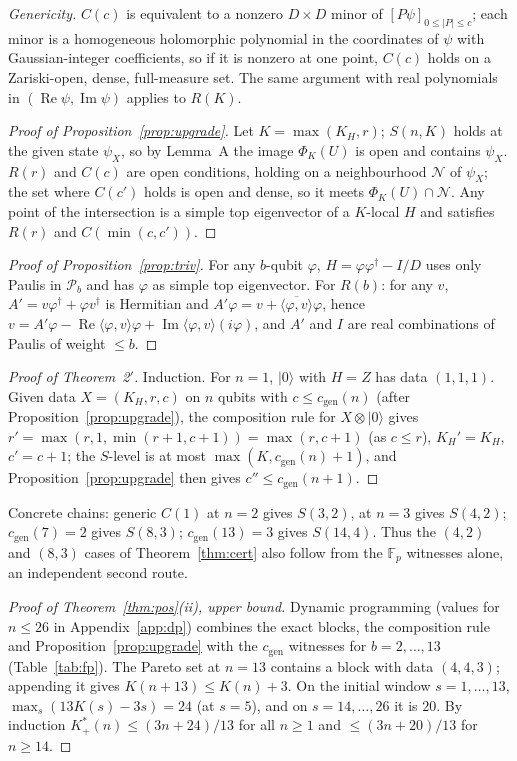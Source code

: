 \documentclass[aps,pra,onecolumn,superscriptaddress,nofootinbib,longbibliography,10pt]{revtex4-2}
\theoremstyle{definition}
\newcommand{\FF}{\mathbb F}
\newcommand{\Kp}{K^{*}_{+}}
\newcommand{\cgen}{c_{\mathrm{gen}}}
\begin{document}
\noindent \emph{Genericity.} $C(c)$ is equivalent to a nonzero $D\times D$ minor of $[P\psi]_{0\le|P|\le c}$; each minor is a homogeneous holomorphic polynomial in the coordinates of $\psi$ with Gaussian-integer coefficients, so if it is nonzero at one point, $C(c)$ holds on a Zariski-open, dense, full-measure set. The same argument with real polynomials in $(\operatorname{Re}\psi,\operatorname{Im}\psi)$ applies to $R(K)$.

\begin{proof}[Proof of Proposition~\ref{prop:upgrade}]
Let $K=\max(K_H,r)$; $S(n,K)$ holds at the given state $\psi_X$, so by Lemma~A the image $\Phi_K(U)$ is open and contains $\psi_X$. $R(r)$ and $C(c)$ are open conditions, holding on a neighbourhood $\mathcal N$ of $\psi_X$; the set where $C(c')$ holds is open and dense, so it meets $\Phi_K(U)\cap\mathcal N$. Any point of the intersection is a simple top eigenvector of a $K$-local $H$ and satisfies $R(r)$ and $C(\min(c,c'))$.
\end{proof}
\begin{proof}[Proof of Proposition~\ref{prop:triv}]
For any $b$-qubit $\varphi$, $H=\varphi\varphi^\dagger-I/D$ uses only Paulis in $\mathcal P_b$ and has $\varphi$ as simple top eigenvector. For $R(b)$: for any $v$, $A'=v\varphi^\dagger+\varphi v^\dagger$ is Hermitian and $A'\varphi=v+\overline{\langle\varphi,v\rangle}\varphi$, hence $v=A'\varphi-\operatorname{Re}\langle\varphi,v\rangle\varphi+\operatorname{Im}\langle\varphi,v\rangle(i\varphi)$, and $A'$ and $I$ are real combinations of Paulis of weight $\le b$.
\end{proof}

\begin{proof}[Proof of Theorem~2$'$]
Induction. For $n=1$, $|0\rangle$ with $H=Z$ has data $(1,1,1)$. Given data $X=(K_H,r,c)$ on $n$ qubits with $c\le\cgen(n)$ (after Proposition~\ref{prop:upgrade}), the composition rule for $X\otimes|0\rangle$ gives $r'=\max(r,1,\min(r+1,c+1))=\max(r,c+1)$ (as $c\le r$), $K_H'=K_H$, $c'=c+1$; the $S$-level is at most $\max(K,\cgen(n)+1)$, and Proposition~\ref{prop:upgrade} then gives $c''\le\cgen(n+1)$.
\end{proof}
\noindent Concrete chains: generic $C(1)$ at $n=2$ gives $S(3,2)$, at $n=3$ gives $S(4,2)$; $\cgen(7)=2$ gives $S(8,3)$; $\cgen(13)=3$ gives $S(14,4)$. Thus the $(4,2)$ and $(8,3)$ cases of Theorem~\ref{thm:cert} also follow from the $\FF_p$ witnesses alone, an independent second route.

\begin{proof}[Proof of Theorem~\ref{thm:pos}(ii), upper bound]
Dynamic programming (values for $n\le26$ in Appendix~\ref{app:dp}) combines the exact blocks, the composition rule and Proposition~\ref{prop:upgrade} with the $\cgen$ witnesses for $b=2,\dots,13$ (Table~\ref{tab:fp}). The Pareto set at $n=13$ contains a block with data $(4,4,3)$; appending it gives $K(n+13)\le K(n)+3$. On the initial window $s=1,\dots,13$, $\max_s(13K(s)-3s)=24$ (at $s=5$), and on $s=14,\dots,26$ it is $20$. By induction $\Kp(n)\le(3n+24)/13$ for all $n\ge1$ and $\le(3n+20)/13$ for $n\ge14$.
\end{proof}
\end{document}
